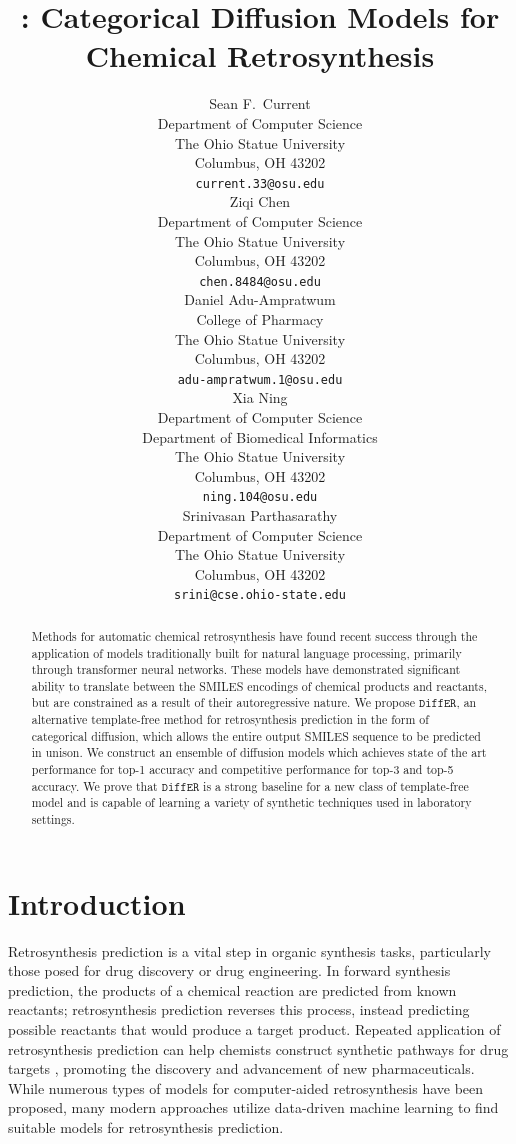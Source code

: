 \documentclass{article}
\title{{\ours}: Categorical Diffusion Models for Chemical Retrosynthesis}
\author{%
  Sean F.~Current \\
  Department of Computer Science \\
  The Ohio Statue University \\
  Columbus, OH 43202 \\
  \texttt{current.33@osu.edu} \\
  \And
  Ziqi Chen \\
  Department of Computer Science \\
  The Ohio Statue University \\
  Columbus, OH 43202 \\
  \texttt{chen.8484@osu.edu} \\
  \And
  Daniel Adu-Ampratwum \\
  College of Pharmacy \\
  The Ohio Statue University \\
  Columbus, OH 43202 \\
  \texttt{adu-ampratwum.1@osu.edu} \\
  \And
  Xia Ning \\
  Department of Computer Science \\
  Department of Biomedical Informatics \\
  The Ohio Statue University \\
  Columbus, OH 43202 \\
  \texttt{ning.104@osu.edu} \\
  \And
  Srinivasan Parthasarathy \\
  Department of Computer Science \\
  The Ohio Statue University \\
  Columbus, OH 43202 \\
  \texttt{srini@cse.ohio-state.edu} \\
 }
\newcommand{\ours}{$\texttt{DiffER}$\xspace}
\begin{document}
\maketitle


\begin{abstract}
  Methods for automatic chemical retrosynthesis have found recent success through the application of models traditionally built for natural language processing, primarily through transformer neural networks. These models have demonstrated significant ability to translate between the SMILES encodings of chemical products and reactants, but are constrained as a result of their autoregressive nature. We propose \ours, an alternative template-free method for retrosynthesis prediction in the form of categorical diffusion, which allows the entire output SMILES sequence to be predicted in unison. We construct an ensemble of diffusion models which achieves state of the art performance for top-1 accuracy and competitive performance for top-3 and top-5 accuracy. We prove that \ours is a strong baseline for a new class of template-free model and is capable of learning a variety of synthetic techniques used in laboratory settings.
\end{abstract}


\section{Introduction}
\label{sec:intro}

Retrosynthesis prediction is a vital step in organic synthesis tasks, particularly those posed for drug discovery or drug engineering. In forward synthesis prediction, the products of a chemical reaction are predicted from known reactants; retrosynthesis prediction reverses this process, instead predicting possible reactants that would produce a target product. Repeated application of retrosynthesis prediction can help chemists construct synthetic pathways for drug targets \cite{segler2017neural, segler2018planning, shen2021automation}, promoting the discovery and advancement of new pharmaceuticals. While numerous types of models for computer-aided retrosynthesis have been proposed, many modern approaches utilize data-driven machine learning to find suitable models for retrosynthesis prediction.
\end{document}
